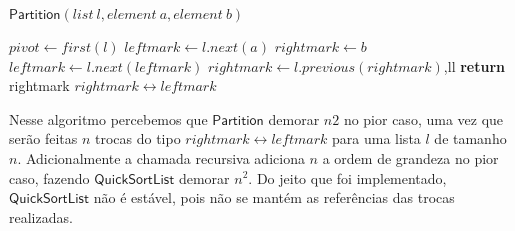 \documentclass{homework}
\begin{document}
\begin{enumerate}
		$\mathsf{Partition}(list\ l, element\ a, element\ b)$
		\begin{algorithmic}[1]
			\State $pivot \gets first(l)$
			\State $leftmark \gets l.next(a)$
			\State $rightmark \gets b$
					\State $leftmark \gets l.next(leftmark)$
				\EndWhile
					\State $rightmark \gets l.previous(rightmark)$,ll
				\EndWhile
					\State \textbf{return} rightmark
				\Else
					\State $rightmark \longleftrightarrow leftmark$
				\EndIf
			\EndWhile
		\end{algorithmic}

\pagebreak		
		
		Nesse algoritmo	percebemos que $\mathsf{Partition}$ demorar $n2$ no pior caso, uma vez que serão feitas $n$ trocas do tipo $rightmark \longleftrightarrow leftmark$ para uma lista $l$ de tamanho $n$. Adicionalmente a chamada recursiva adiciona $n$ a ordem de grandeza no pior caso, fazendo $\mathsf{QuickSortList}$ demorar $n^2$. Do jeito que foi implementado, $\mathsf{QuickSortList}$ não é estável, pois não se mantém as referências das trocas realizadas.
		
	\end{enumerate}
\end{document}
